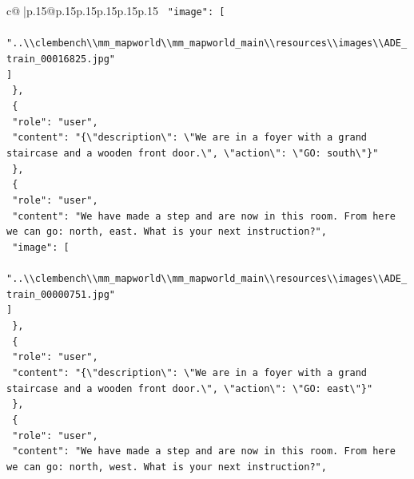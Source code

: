\documentclass{article}
\begin{document}
{\begin{supertabular}{c@{$\;$}|p{.15\linewidth}@{}p{.15\linewidth}p{.15\linewidth}p{.15\linewidth}p{.15\linewidth}p{.15\linewidth}}
{{{\texttt{    "image": {[}} \\
\texttt{      "..\textbackslash{}\textbackslash{}clembench\textbackslash{}\textbackslash{}mm\_mapworld\textbackslash{}\textbackslash{}mm\_mapworld\_main\textbackslash{}\textbackslash{}resources\textbackslash{}\textbackslash{}images\textbackslash{}\textbackslash{}ADE\_train\_00016825.jpg"} \\
\texttt{    {]}} \\
\texttt{  \},} \\
\texttt{  \{} \\
\texttt{    "role": "user",} \\
\texttt{    "content": "\{\textbackslash{}"description\textbackslash{}": \textbackslash{}"We are in a foyer with a grand staircase and a wooden front door.\textbackslash{}", \textbackslash{}"action\textbackslash{}": \textbackslash{}"GO: south\textbackslash{}"\}"} \\
\texttt{  \},} \\
\texttt{  \{} \\
\texttt{    "role": "user",} \\
\texttt{    "content": "We have made a step and are now in this room. From here we can go: north, east. What is your next instruction?",} \\
\texttt{    "image": {[}} \\
\texttt{      "..\textbackslash{}\textbackslash{}clembench\textbackslash{}\textbackslash{}mm\_mapworld\textbackslash{}\textbackslash{}mm\_mapworld\_main\textbackslash{}\textbackslash{}resources\textbackslash{}\textbackslash{}images\textbackslash{}\textbackslash{}ADE\_train\_00000751.jpg"} \\
\texttt{    {]}} \\
\texttt{  \},} \\
\texttt{  \{} \\
\texttt{    "role": "user",} \\
\texttt{    "content": "\{\textbackslash{}"description\textbackslash{}": \textbackslash{}"We are in a foyer with a grand staircase and a wooden front door.\textbackslash{}", \textbackslash{}"action\textbackslash{}": \textbackslash{}"GO: east\textbackslash{}"\}"} \\
\texttt{  \},} \\
\texttt{  \{} \\
\texttt{    "role": "user",} \\
\texttt{    "content": "We have made a step and are now in this room. From here we can go: north, west. What is your next instruction?",} \\
}}}
\end{supertabular}}
\end{document}
